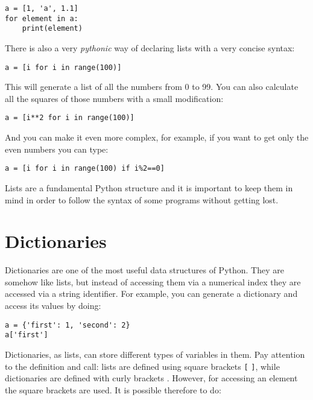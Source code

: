 \begin{verbatim}
a = [1, 'a', 1.1]
for element in a:
    print(element)
\end{verbatim}

There is also a very \emph{pythonic} way of declaring lists with a very
concise syntax:

\begin{verbatim}
a = [i for i in range(100)]
\end{verbatim}

This will generate a list of all the numbers from 0 to 99. You can also
calculate all the squares of those numbers with a small modification:

\begin{verbatim}
a = [i**2 for i in range(100)]
\end{verbatim}

And you can make it even more complex, for example, if you want to get
only the even numbers you can type:

\begin{verbatim}
a = [i for i in range(100) if i%2==0]
\end{verbatim}


Lists are a fundamental Python structure and it is important to keep
them in mind in order to follow the syntax of some programs without
getting lost.

\section{Dictionaries}\label{dictionaries}
Dictionaries are one of the most useful data structures of Python. They
are somehow like lists, but instead of accessing them via a numerical
index they are accessed via a string identifier. For example, you can
generate a dictionary and access its values by doing:

\begin{verbatim}
a = {'first': 1, 'second': 2}
a['first']
\end{verbatim}

Dictionaries, as lists, can store different types of variables in them.
Pay attention to the definition and call: lists are defined using square
brackets \texttt{[} \texttt{]}, while dictionaries are defined with
curly brackets \texttt{{}}. However, for accessing an
element the square brackets are used. It is possible therefore to do:

